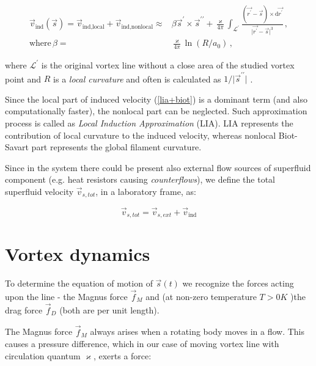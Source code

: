 \begin{align}
\vec{v}_{\text{ind}}(\vec{s})
= \vec{v}_{\text{ind,local}} + \vec{v}_{\text{ind,nonlocal}}
\approx& \beta \vec{s}^{\prime} \times \vec{s}^{\prime \prime} + \frac{\varkappa}{4\pi} \int_{\mathcal{L}^{\prime}} \frac{(\vec{r^{\prime}} - \vec{s}) \times \text{d}\vec{r^{\prime}}}{\vert \vec{r^{\prime}} - \vec{s} \vert^3}\,,
\label{lia+biot}
\\
\text{where}\, \beta =& \frac{\varkappa}{4\pi} \ln(R / a_0)\,,
\label{beta}
\end{align}

where $\mathcal{L}^{\prime}$ is the original vortex line without a close area of the studied vortex point and $R$ is a \textit{local curvature} and often is calculated as $1 / \vert \vec{s}^{\prime\prime} \vert$ \cite{schwarz}.

Since the local part of induced velocity (\ref{lia+biot}) is a dominant term (and also computationally faster), the nonlocal part can be neglected. Such approximation process is called as \textit{Local Induction Approximation} (LIA). LIA represents the contribution of local curvature to the induced velocity, whereas nonlocal Biot-Savart part represents the global filament curvature.

Since in the system there could be present also external flow sources of superfluid component (e.g. heat resistors causing \textit{counterflows}), we define the total superfluid velocity $\vec{v}_{s,tot}$, in a laboratory frame, as:

\begin{equation}
\vec{v}_{s,tot} = \vec{v}_{s,ext} + \vec{v}_{\text{ind}}
\end{equation}

\newpage



\section{Vortex dynamics}

To determine the equation of motion of $\vec{s}(t)$ we recognize the forces acting upon the line - the Magnus force $\vec{f}_M$ and (at non-zero temperature $T>0\unit{K}$ )the drag force $\vec{f}_D$ (both are per unit length).

The Magnus force $\vec{f}_M$ always arises when a rotating body moves in a flow. This causes a pressure difference, which in our case of moving vortex line with circulation quantum $\varkappa$, exerts a force:

